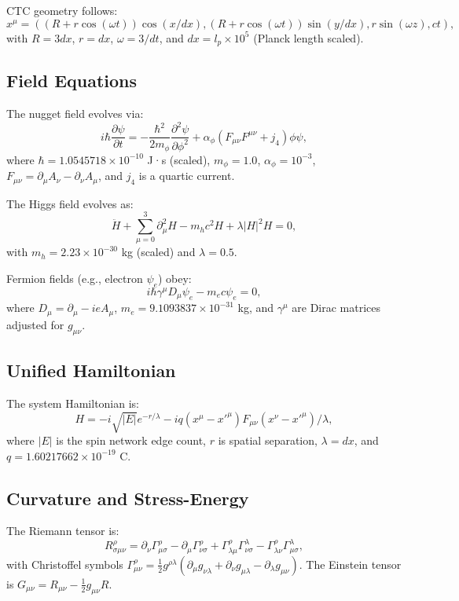 \documentclass[11pt]{article}
\begin{document}
CTC geometry follows:
\begin{equation}
x^\mu = \left( (R + r \cos(\omega t)) \cos(x/dx), (R + r \cos(\omega t)) \sin(y/dx), r \sin(\omega z), c t \right),
\end{equation}
with $R = 3dx$, $r = dx$, $\omega = 3/dt$, and $dx = l_p \times 10^5$ (Planck length scaled).

\subsection{Field Equations}
The nugget field evolves via:
\begin{equation}
i \hbar \frac{\partial \psi}{\partial t} = -\frac{\hbar^2}{2 m_\phi} \frac{\partial^2 \psi}{\partial \phi^2} + \alpha_\phi (F_{\mu\nu} F^{\mu\nu} + j_4) \phi \psi,
\label{eq:nugget}
\end{equation}
where $\hbar = 1.0545718 \times 10^{-10}$ J·s (scaled), $m_\phi = 1.0$, $\alpha_\phi = 10^{-3}$, $F_{\mu\nu} = \partial_\mu A_\nu - \partial_\nu A_\mu$, and $j_4$ is a quartic current.

The Higgs field evolves as:
\begin{equation}
\ddot{H} + \sum_{\mu=0}^{3} \partial_\mu^2 H - m_h c^2 H + \lambda |H|^2 H = 0,
\end{equation}
with $m_h = 2.23 \times 10^{-30}$ kg (scaled) and $\lambda = 0.5$.

Fermion fields (e.g., electron $\psi_e$) obey:
\begin{equation}
i \hbar \gamma^\mu D_\mu \psi_e - m_e c \psi_e = 0,
\end{equation}
where $D_\mu = \partial_\mu - i e A_\mu$, $m_e = 9.1093837 \times 10^{-31}$ kg, and $\gamma^\mu$ are Dirac matrices adjusted for $g_{\mu\nu}$.

\subsection{Unified Hamiltonian}
The system Hamiltonian is:
\begin{equation}
H = -i \sqrt{|E|} e^{-r/\lambda} - i q (x^\mu - x'^\mu) F_{\mu\nu} (x^\nu - x'^\mu) / \lambda,
\label{eq:hamiltonian}
\end{equation}
where $|E|$ is the spin network edge count, $r$ is spatial separation, $\lambda = dx$, and $q = 1.60217662 \times 10^{-19}$ C.

\subsection{Curvature and Stress-Energy}
The Riemann tensor is:
\begin{equation}
R^\rho_{\sigma\mu\nu} = \partial_\nu \Gamma^\rho_{\mu\sigma} - \partial_\mu \Gamma^\rho_{\nu\sigma} + \Gamma^\rho_{\lambda\mu} \Gamma^\lambda_{\nu\sigma} - \Gamma^\rho_{\lambda\nu} \Gamma^\lambda_{\mu\sigma},
\end{equation}
with Christoffel symbols $\Gamma^\rho_{\mu\nu} = \frac{1}{2} g^{\rho\lambda} (\partial_\mu g_{\nu\lambda} + \partial_\nu g_{\mu\lambda} - \partial_\lambda g_{\mu\nu})$. The Einstein tensor is $G_{\mu\nu} = R_{\mu\nu} - \frac{1}{2} g_{\mu\nu} R$.
\end{document}
